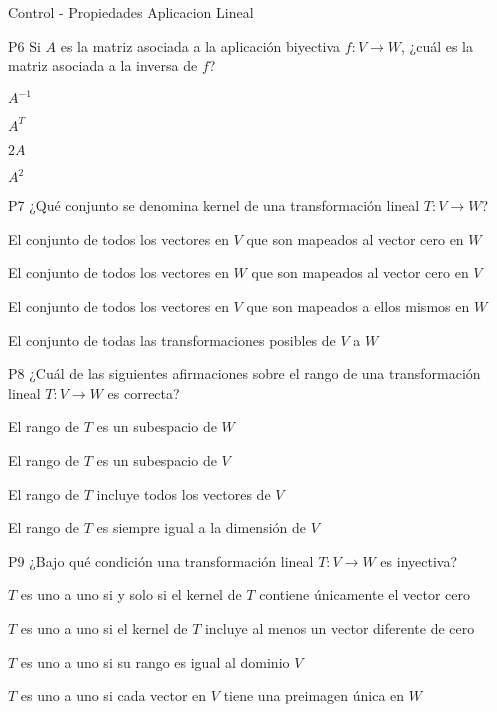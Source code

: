 \documentclass[a4,11pt]{aleph-notas}
\begin{document}
\begin{quiz}{Control - Propiedades Aplicacion Lineal}
\begin{multi}[]%
    {P6}     
    Si \( A \) es la matriz asociada a la aplicación biyectiva \( f : V \rightarrow W \), ¿cuál es la matriz asociada a la inversa de \( f \)?     
    \item* \( A^{-1} \)     
    \item \( A^{T} \)
    \item \( 2A \)     
    \item \( A^2 \)
\end{multi}


\begin{multi}[]%
    {P7}     
    ¿Qué conjunto se denomina kernel de una transformación lineal \(T: V \rightarrow W\)?     
    \item* El conjunto de todos los vectores en \(V\) que son mapeados al vector cero en \(W\)     
    \item El conjunto de todos los vectores en \(W\) que son mapeados al vector cero en \(V\)     
    \item El conjunto de todos los vectores en \(V\) que son mapeados a ellos mismos en \(W\)     
    \item El conjunto de todas las transformaciones posibles de \(V\) a \(W\)
\end{multi}

\begin{multi}[]%
    {P8}     
    ¿Cuál de las siguientes afirmaciones sobre el rango de una transformación lineal \(T: V \rightarrow W\) es correcta?     
    \item* El rango de \(T\) es un subespacio de \(W\)     
    \item El rango de \(T\) es un subespacio de \(V\)     
    \item El rango de \(T\) incluye todos los vectores de \(V\)     
    \item El rango de \(T\) es siempre igual a la dimensión de \(V\)
\end{multi}

\begin{multi}[]%
    {P9}     
    ¿Bajo qué condición una transformación lineal \(T: V \rightarrow W\) es inyectiva?     
    \item* \(T\) es uno a uno si y solo si el kernel de \(T\) contiene únicamente el vector cero     
    \item \(T\) es uno a uno si el kernel de \(T\) incluye al menos un vector diferente de cero     
    \item \(T\) es uno a uno si su rango es igual al dominio \(V\)     
    \item \(T\) es uno a uno si cada vector en \(V\) tiene una preimagen única en \(W\)
\end{multi}


\end{quiz}
\end{document}
